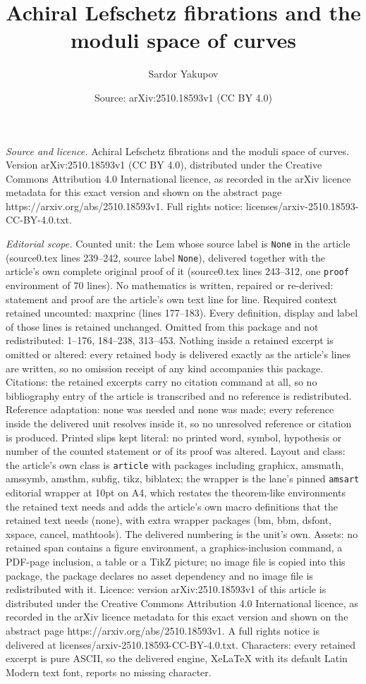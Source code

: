 \documentclass[10pt,a4paper]{amsart}
\title[Achiral Lefschetz fibrations and the moduli space of curves]{Achiral Lefschetz fibrations and the moduli space of curves}
\author{Sardor Yakupov}
\date{Source: arXiv:2510.18593v1 (CC BY 4.0)}
\begin{document}
\maketitle

\noindent\emph{Source and licence.} Achiral Lefschetz fibrations and the moduli space of curves. Version arXiv:2510.18593v1 (CC BY 4.0), distributed under the Creative Commons Attribution 4.0 International licence, as recorded in the arXiv licence metadata for this exact version and shown on the abstract page https://arxiv.org/abs/2510.18593v1. Full rights notice: licenses/arxiv-2510.18593-CC-BY-4.0.txt.\par\smallskip

\noindent\textit{Editorial scope.} Counted unit: the Lem whose source label is \texttt{None} in the article (source0.tex lines 239--242, source label \texttt{None}), delivered together with the article's own complete original proof of it (source0.tex lines 243--312, one \texttt{proof} environment of 70 lines). No mathematics is written, repaired or re-derived: statement and proof are the article's own text line for line. Required context retained uncounted: maxprinc (lines 177--183). Every definition, display and label of those lines is retained unchanged. Omitted from this package and not redistributed: 1--176, 184--238, 313--453. Nothing inside a retained excerpt is omitted or altered: every retained body is delivered exactly as the article's lines are written, so no omission receipt of any kind accompanies this package. Citations: the retained excerpts carry no citation command at all, so no bibliography entry of the article is transcribed and no reference is redistributed. Reference adaptation: none was needed and none was made; every reference inside the delivered unit resolves inside it, so no unresolved reference or citation is produced. Printed slips kept literal: no printed word, symbol, hypothesis or number of the counted statement or of its proof was altered. Layout and class: the article's own class is \texttt{article} with packages including graphicx, amsmath, amssymb, amsthm, subfig, tikz, biblatex; the wrapper is the lane's pinned \texttt{amsart} editorial wrapper at 10pt on A4, which restates the theorem-like environments the retained text needs and adds the article's own macro definitions that the retained text needs (none), with extra wrapper packages (bm, bbm, dsfont, xspace, cancel, mathtools). The delivered numbering is the unit's own. Assets: no retained span contains a figure environment, a graphics-inclusion command, a PDF-page inclusion, a table or a TikZ picture; no image file is copied into this package, the package declares no asset dependency and no image file is redistributed with it. Licence: version arXiv:2510.18593v1 of this article is distributed under the Creative Commons Attribution 4.0 International licence, as recorded in the arXiv licence metadata for this exact version and shown on the abstract page https://arxiv.org/abs/2510.18593v1. A full rights notice is delivered at licenses/arxiv-2510.18593-CC-BY-4.0.txt. Characters: every retained excerpt is pure ASCII, so the delivered engine, XeLaTeX with its default Latin Modern text font, reports no missing character.
\end{document}

